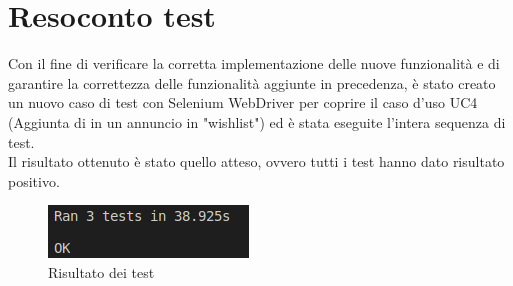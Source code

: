 \documentclass[10pt,a4paper]{article}
\begin{document}
\section{Resoconto test}
Con il fine di verificare la corretta implementazione delle nuove funzionalità e di garantire la correttezza delle funzionalità aggiunte in precedenza, è stato creato un nuovo caso di test con Selenium WebDriver per coprire il caso d'uso UC4 (Aggiunta di in un annuncio in "wishlist") ed è stata eseguite l'intera sequenza di test.\\
Il risultato ottenuto è stato quello atteso, ovvero tutti i test hanno dato risultato positivo.
\begin{figure}[H]
	\centering
	\includegraphics[scale=0.9]{tests_i3b.png}
	\caption{Risultato dei test}
\end{figure}
\end{document}
